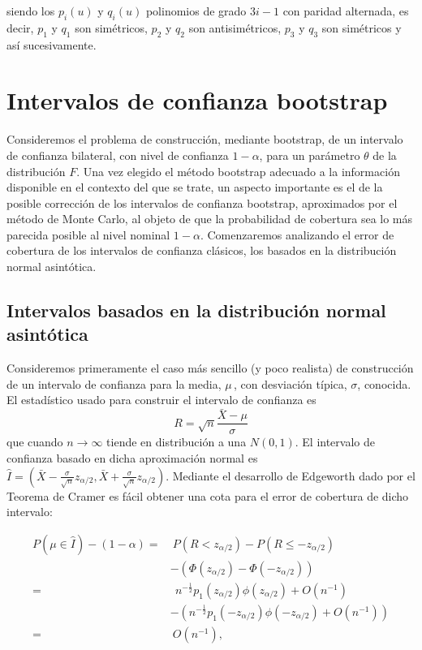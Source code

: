\documentclass[]{book}
\theoremstyle{definition}
\theoremstyle{definition}
\theoremstyle{definition}
\theoremstyle{remark}
\begin{document}
siendo los \(p_i\left( u \right)\) y \(q_i\left( u \right)\) polinomios
de grado \(3i-1\) con paridad alternada, es decir, \(p_1\) y \(q_1\) son
simétricos, \(p_2\) y \(q_2\) son antisimétricos, \(p_3\) y \(q_3\) son
simétricos y así sucesivamente.

\chapter{Intervalos de confianza bootstrap}\label{cap5}

Consideremos el problema de construcción, mediante bootstrap, de un
intervalo de confianza bilateral, con nivel de confianza \(1-\alpha\),
para un parámetro \(\theta\) de la distribución \(F\). Una vez elegido
el método bootstrap adecuado a la información disponible en el contexto
del que se trate, un aspecto importante es el de la posible corrección
de los intervalos de confianza bootstrap, aproximados por el método de
Monte Carlo, al objeto de que la probabilidad de cobertura sea lo más
parecida posible al nivel nominal \(1-\alpha\). Comenzaremos analizando
el error de cobertura de los intervalos de confianza clásicos, los
basados en la distribución normal asintótica.

\section{Intervalos basados en la distribución normal
asintótica}\label{cap5_norm}

Consideremos primeramente el caso más sencillo (y poco realista) de
construcción de un intervalo de confianza para la media, \(\mu \,\), con
desviación típica, \(\sigma\), conocida. El estadístico usado para
construir el intervalo de confianza es
\[R=\sqrt{n}\frac{\bar{X}-\mu }{\sigma }\]que cuando
\(n\rightarrow \infty\) tiende en distribución a una
\(N\left( 0,1 \right)\). El intervalo de confianza basado en dicha
aproximación normal es
\(\hat{I}=\left( \bar{X}-\frac{\sigma }{\sqrt{n}}z_{\alpha /2}, \bar{X}+\frac{\sigma }{\sqrt{n}}z_{\alpha /2} \right)\).
Mediante el desarrollo de Edgeworth dado por el Teorema de Cramer es
fácil obtener una cota para el error de cobertura de dicho intervalo:

\[\begin{aligned}
P\left( \mu \in \hat{I} \right) -\left( 1-\alpha \right) =&\  P\left(
R<z_{\alpha /2} \right) -P\left( R\leq -z_{\alpha /2} \right) \\
&-\left( \Phi \left( z_{\alpha /2} \right) -\Phi \left( -z_{\alpha
/2} \right) \right) \\
=&\ \ n^{-\frac{1}{2}}p_1\left( z_{\alpha /2} \right) \phi \left( z_{\alpha
/2} \right) +O\left( n^{-1} \right) \\
&-\left( n^{-\frac{1}{2}}p_1\left( -z_{\alpha /2} \right) \phi \left(
-z_{\alpha /2} \right) +O\left( n^{-1} \right) \right) \\
=&\  O\left( n^{-1} \right),\end{aligned}\]
\end{document}
